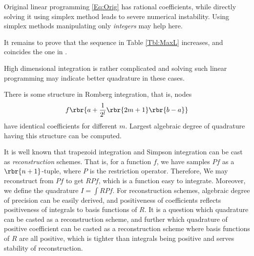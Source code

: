 \documentclass[english, nochinese]{../textmpls/pkupaper}
\begin{document}
\begin{partlist}
\item Original linear programming \eqref{Eq:Orig} has rational coefficients, while directly solving it using simplex method leads to severe numerical instability. Using simplex methods manipulating only \emph{integers} may help here.
\item It remains to prove that the sequence in Table \ref{Tbl:MaxL} increases, and coincides the one in \parencite{forster_weighted_1986}.
\item High dimensional integration is rather complicated and solving such linear programming may indicate better quadrature in these cases.
\item There is some structure in Romberg integration, that is, nodes
\begin{equation}
f \rbr{ a + \frac{1}{2^l} \rbr{ 2 m + 1 } \rbr{ b - a } }
\end{equation}
have identical coefficients for different $m$. Largest algebraic degree of quadrature having this structure can be computed.
\item It is well known that trapezoid integration and Simpson integration can be cast as \emph{reconstruction} schemes. That is, for a function $f$, we have samples $ P f $ as a $ \rbr{ n + 1 } $-tuple, where $P$ is the restriction operator. Therefore, We may reconstruct from $ P f $ to get $ R P f $, which is a function easy to integrate. Moreover, we define the quadrature $ I = \int R P f $. For reconstruction schemes, algebraic degree of precision can be easily derived, and positiveness of coefficients reflects positiveness of integrals to basis functions of $R$. It is a question which quadrature can be casted as a reconstruction scheme, and further which quadrature of positive coefficient can be casted as a reconstruction scheme where basis functions of $R$ are all positive, which is tighter than integrals being positive and serves stability of reconstruction.
\end{partlist}

\printbibliography
\end{document}
